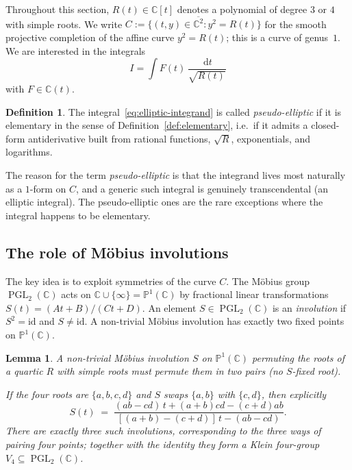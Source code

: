 \documentclass[11pt,a4paper]{article}
\theoremstyle{plain}
\newtheorem{lemma}[theorem]{Lemma}
\theoremstyle{definition}
\newtheorem{definition}[theorem]{Definition}
\theoremstyle{remark}
\newcommand{\C}{\mathbb{C}}
\newcommand{\PGL}{\operatorname{PGL}}
\renewcommand{\d}{\,\mathrm{d}}
\begin{document}
Throughout this section, $R(t)\in\C[t]$ denotes a polynomial of degree $3$ or $4$ with simple roots. We write $C := \{(t,y)\in\overline{\C^2} : y^2 = R(t)\}$ for the smooth projective completion of the affine curve $y^2=R(t)$; this is a curve of genus~$1$. We are interested in the integrals
\begin{equation}\label{eq:elliptic-integrand}
  I = \int F(t)\,\frac{\d t}{\sqrt{R(t)}}
\end{equation}
with $F\in\C(t)$.

\begin{definition}\label{def:pseudo-elliptic}
The integral~\eqref{eq:elliptic-integrand} is called \emph{pseudo-elliptic} if it is elementary in the sense of Definition~\ref{def:elementary}, i.e.\ if it admits a closed-form antiderivative built from rational functions, $\sqrt{R}$, exponentials, and logarithms.
\end{definition}

The reason for the term \emph{pseudo-elliptic} is that the integrand lives most naturally as a $1$-form on $C$, and a generic such integral is genuinely transcendental (an elliptic integral). The pseudo-elliptic ones are the rare exceptions where the integral happens to be elementary.

\subsection{The role of M\"obius involutions}

The key idea is to exploit symmetries of the curve $C$. The M\"obius group $\PGL_2(\C)$ acts on $\C\cup\{\infty\}=\mathbb{P}^1(\C)$ by fractional linear transformations $S(t) = (At+B)/(Ct+D)$. An element $S \in \PGL_2(\C)$ is an \emph{involution} if $S^2 = \mathrm{id}$ and $S\neq \mathrm{id}$. A non-trivial M\"obius involution has exactly two fixed points on $\mathbb{P}^1(\C)$.

\begin{lemma}\label{lem:involutions-pairs}
A non-trivial M\"obius involution $S$ on $\mathbb{P}^1(\C)$ permuting the roots of a quartic $R$ with simple roots must permute them in two pairs (no $S$-fixed root).

If the four roots are $\{a,b,c,d\}$ and $S$ swaps $\{a,b\}$ with $\{c,d\}$, then explicitly
\begin{equation}\label{eq:involution-formula}
  S(t) \;=\; \frac{(ab-cd)\,t + (a+b)cd - (c+d)ab}{[(a+b)-(c+d)]\,t - (ab-cd)}.
\end{equation}
There are exactly three such involutions, corresponding to the three ways of pairing four points; together with the identity they form a Klein four-group $V_4 \subseteq \PGL_2(\C)$.
\end{lemma}
\end{document}
